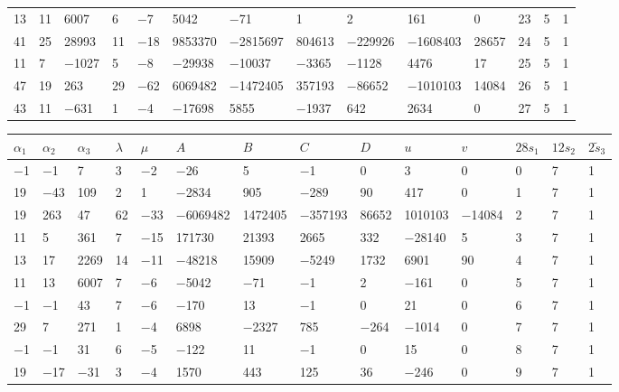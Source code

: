 \documentclass[10pt,a4paper]{amsart}
\numberwithin{equation}{section}
\theoremstyle{definition}
\numberwithin{table}{section}
\begin{document}
{\begin{paracol}{3}
\begin{supertabular}{|w{c}{.32cm}w{c}{.32cm}w{c}{.32cm}@{\hspace{.5cm}}w{c}{.2cm}w{c}{.2cm}|@{\hspace{\tabcolsep}}HHHHHHw{c}{.17cm}w{c}{.17cm}w{c}{.17cm}|}
			13 & 11 & 6007 & 6 & $-$7 & 5042 & $-$71 & 1 & 2 & 161 & 0 & 23 & 5 & 1 \\
			41 & 25 & 28993 & 11 & $-$18 & 9853370 & $-$2815697 & 804613 & $-$229926 & $-$1608403 & 28657 & 24 & 5 & 1 \\
			11 & 7 & $-$1027 & 5 & $-$8 & $-$29938 & $-$10037 & $-$3365 & $-$1128 & 4476 & 17 & 25 & 5 & 1 \\
			47 & 19 & 263 & 29 & $-$62 & 6069482 & $-$1472405 & 357193 & $-$86652 & $-$1010103 & 14084 & 26 & 5 & 1 \\
			43 & 11 & $-$631 & 1 & $-$4 & $-$17698 & 5855 & $-$1937 & 642 & 2634 & 0 & 27 & 5 & 1 \\ \hline
		\end{supertabular}
		
		\switchcolumn
		
		\begin{supertabular}{|w{c}{.32cm}w{c}{.32cm}w{c}{.32cm}@{\hspace{.5cm}}w{c}{.2cm}w{c}{.2cm}|@{\hspace{\tabcolsep}}HHHHHHw{c}{.17cm}w{c}{.17cm}w{c}{.17cm}|}
			\hline $\alpha_1$ & $\alpha_2$ & $\alpha_3$ & $\lambda$ & $\mu$ & $A$ & $B$ & $C$ & $D$ & $u$ & $v$ & $28s_1$ & $12s_2$ & $2\tilde{s}_3$ \\ \hline
			$-$1 & $-$1 & 7 & 3 & $-$2 & $-$26 & 5 & $-$1 & 0 & 3 & 0 & 0 & 7 & 1 \\
			19 & $-$43 & 109 & 2 & 1 & $-$2834 & 905 & $-$289 & 90 & 417 & 0 & 1 & 7 & 1 \\
			19 & 263 & 47 & 62 & $-$33 & $-$6069482 & 1472405 & $-$357193 & 86652 & 1010103 & $-$14084 & 2 & 7 & 1 \\
			11 & 5 & 361 & 7 & $-$15 & 171730 & 21393 & 2665 & 332 & $-$28140 & 5 & 3 & 7 & 1 \\
			13 & 17 & 2269 & 14 & $-$11 & $-$48218 & 15909 & $-$5249 & 1732 & 6901 & 90 & 4 & 7 & 1 \\
			11 & 13 & 6007 & 7 & $-$6 & $-$5042 & $-$71 & $-$1 & 2 & $-$161 & 0 & 5 & 7 & 1 \\
			$-$1 & $-$1 & 43 & 7 & $-$6 & $-$170 & 13 & $-$1 & 0 & 21 & 0 & 6 & 7 & 1 \\
			29 & 7 & 271 & 1 & $-$4 & 6898 & $-$2327 & 785 & $-$264 & $-$1014 & 0 & 7 & 7 & 1 \\
			$-$1 & $-$1 & 31 & 6 & $-$5 & $-$122 & 11 & $-$1 & 0 & 15 & 0 & 8 & 7 & 1 \\
			19 & $-$17 & $-$31 & 3 & $-$4 & 1570 & 443 & 125 & 36 & $-$246 & 0 & 9 & 7 & 1 \\

\end{supertabular}
\end{paracol}}
\end{document}
